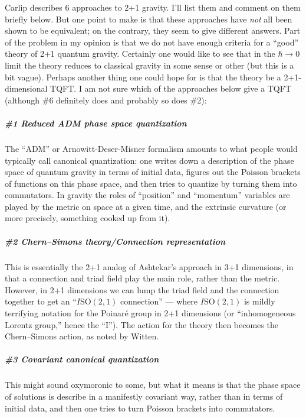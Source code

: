 \documentclass[12pt]{article}
\begin{document}
Carlip describes 6 approaches to 2+1 gravity. I'll list them and comment
on them briefly below. But one point to make is that these approaches
have \emph{not} all been shown to be equivalent; on the contrary, they
seem to give different answers. Part of the problem in my opinion is
that we do not have enough criteria for a ``good'' theory of 2+1 quantum
gravity. Certainly one would like to see that in the \(\hbar\to 0\)
limit the theory reduces to classical gravity in some sense or other
(but this is a bit vague). Perhaps another thing one could hope for is
that the theory be a 2+1-dimensional TQFT. I am not sure which of the
approaches below give a TQFT (although \#6 definitely does and probably
so does \#2):

\hypertarget{reduced-adm-phase-space-quantization}{%
\subparagraph{\#1 Reduced ADM phase space
quantization}\label{reduced-adm-phase-space-quantization}}

The ``ADM'' or Arnowitt-Deser-Misner formalism amounts to what people
would typically call canonical quantization: one writes down a
description of the phase space of quantum gravity in terms of initial
data, figures out the Poisson brackets of functions on this phase space,
and then tries to quantize by turning them into commutators. In gravity
the roles of ``position'' and ``momentum'' variables are played by the
metric on space at a given time, and the extrinsic curvature (or more
precisely, something cooked up from it).

\hypertarget{chern-simons-theoryconnection-representation}{%
\subparagraph{\#2 Chern--Simons theory/Connection
representation}\label{chern-simons-theoryconnection-representation}}

This is essentially the 2+1 analog of Ashtekar's approach in 3+1
dimensions, in that a connection and triad field play the main role,
rather than the metric. However, in 2+1 dimensions we can lump the triad
field and the connection together to get an ``\(I\mathrm{SO}(2,1)\)
connection'' --- where \(I\mathrm{SO}(2,1)\) is mildly terrifying
notation for the Poinar\'e group in 2+1 dimensions (or ``inhomogeneous
Lorentz group,'' hence the ``I''). The action for the theory then
becomes the Chern--Simons action, as noted by Witten.

\hypertarget{covariant-canonical-quantization}{%
\subparagraph{\#3 Covariant canonical
quantization}\label{covariant-canonical-quantization}}

This might sound oxymoronic to some, but what it means is that the phase
space of solutions is describe in a manifestly covariant way, rather
than in terms of initial data, and then one tries to turn Poisson
brackets into commutators.
\end{document}
